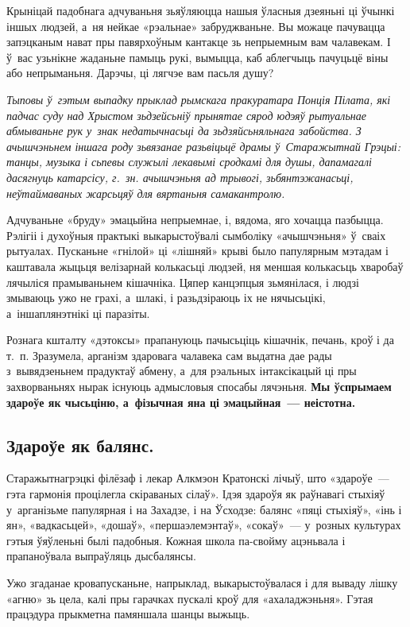 Крыніцай падобнага адчуваньня зьяўляюцца нашыя ўласныя дзеяньні ці ўчынкі іншых людзей, а~ня нейкае «рэальнае» забруджваньне. Вы можаце пачувацца запэцканым нават пры павярхоўным кантакце зь непрыемным вам чалавекам. І ў~вас узьнікне жаданьне памыць рукі, вымыцца, каб аблегчыць пачуцьцё віны або непрыманьня. Дарэчы, ці лягчэе вам пасьля душу?

\emph{Тыповы ў~гэтым выпадку прыклад рымскага пракуратара Понція Пілата, які падчас суду над Хрыстом зьдзейсьніў прынятае сярод юдэяў рытуальнае абмываньне рук у~знак недатычнасьці да зьдзяйсьняльнага забойства. З ачышчэньнем іншага роду зьвязанае разьвіцьцё драмы ў~Старажытнай Грэцыі: танцы, музыка і сьпевы служылі лекавымі сродкамі для душы, дапамагалі дасягнуць катарсісу, г.~зн. ачышчэньня ад трывогі, зьбянтэжанасьці, неўтаймаваных жарсьцяў для вяртаньня самакантролю.}

Адчуваньне «бруду» эмацыйна непрыемнае, і, вядома, яго хочацца пазбыцца. Рэлігіі і духоўныя практыкі выкарыстоўвалі сымболіку «ачышчэньня» ў~сваіх рытуалах. Пусканьне «гнілой» ці «лішняй» крыві было папулярным мэтадам і каштавала жыцьця велізарнай колькасьці людзей, ня меншая колькасьць хваробаў лячыліся прамываньнем кішачніка. Цяпер канцэпцыя зьмянілася, і людзі змываюць ужо не грахі, а~шлакі, і разьдзіраюць іх не нячысьцікі, а~іншаплянэтнікі ці паразіты.

Рознага кшталту «дэтоксы» прапануюць пачысьціць кішачнік, печань, кроў і да т.~п. Зразумела, арганізм здаровага чалавека сам выдатна дае рады з~вывядзеньнем прадуктаў абмену, а~для рэальных інтаксікацый ці пры захворваньнях нырак існуюць адмысловыя спосабы лячэньня. \textbf{Мы ўспрымаем здароўе як чысьціню, а~фізычная яна ці эмацыйная~--- неістотна.}

\subsection*{Здароўе як балянс.} 

Старажытнагрэцкі філёзаф і лекар Алкмэон Кратонскі лічыў, што «здароўе~--- гэта гармонія процілегла скіраваных сілаў». Ідэя здароўя як раўнавагі стыхіяў у~арганізьме папулярная і на Захадзе, і на Ўсходзе: балянс «пяці стыхіяў», «інь і ян», «вадкасьцей», «дошаў», «першаэлемэнтаў», «сокаў»~--- у~розных культурах гэтыя ўяўленьні былі падобныя. Кожная школа па-свойму ацэньвала і прапаноўвала выпраўляць дысбалянсы.

Ужо згаданае кровапусканьне, напрыклад, выкарыстоўвалася і для вываду лішку «агню» зь цела, калі пры гарачках пускалі кроў для «ахаладжэньня». Гэтая працэдура прыкметна памяншала шанцы выжыць. 

